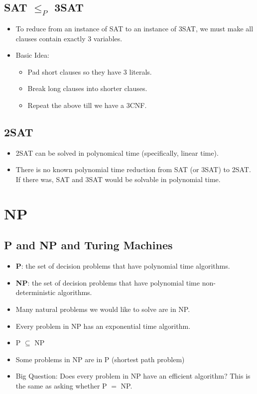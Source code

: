 \documentclass[12pt]{article}
\begin{document}
\subsection{SAT $\leq_P$ 3SAT}
\begin{itemize}
    \item To reduce from an instance of SAT to an instance of 3SAT, we must make all clauses contain exactly 3 variables.
    \item Basic Idea:
    \begin{itemize}
        \item Pad short clauses so they have 3 literals.
        \item Break long clauses into shorter clauses.
        \item Repeat the above till we have a 3CNF.
    \end{itemize}
\end{itemize}

\subsection{2SAT}
\begin{itemize}
    \item 2SAT can be solved in polynomical time (specifically, linear time).
    \item There is no known polynomial time reduction from SAT (or 3SAT) to 2SAT. If there was, SAT and 3SAT would be solvable in polynomial time.
\end{itemize}

\section{NP}

\subsection{P and NP and Turing Machines}
\begin{itemize}
    \item \textbf{P}: the set of decision problems that have polynomial time algorithms.
    \item \textbf{NP}: the set of decision problems that have polynomial time non-deterministic algorithms.
    \item Many natural problems we would like to solve are in NP.
    \item Every problem in NP has an exponential time algorithm.
    \item P $\subseteq$ NP
    \item Some problems in NP are in P (shortest path problem)
    \item Big Question: Does every problem in NP have an efficient algorithm? This is the same as asking whether P $=$ NP.
\end{itemize}
\end{document}
